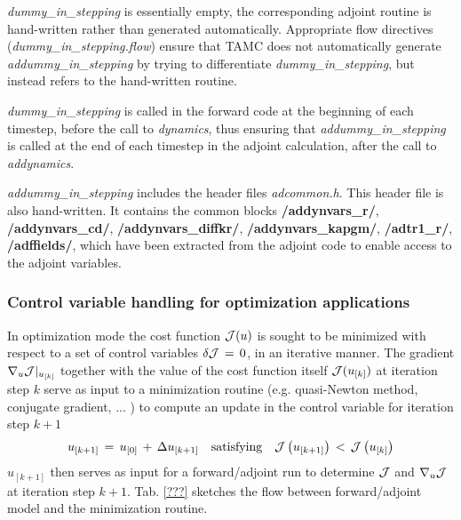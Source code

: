 \begin{itemize}
{\it dummy\_in\_stepping} is essentially empty,
the corresponding adjoint routine is hand-written rather
than generated automatically.
Appropriate flow directives ({\it dummy\_in\_stepping.flow})
ensure that TAMC does not automatically 
generate {\it addummy\_in\_stepping} by trying to differentiate
{\it dummy\_in\_stepping}, but instead refers to 
the hand-written routine.

{\it dummy\_in\_stepping} is called in the forward code
at the beginning of each
timestep, before the call to {\it dynamics}, thus ensuring
that {\it addummy\_in\_stepping} is called at the end of
each timestep in the adjoint calculation, after the call to
{\it addynamics}.

{\it addummy\_in\_stepping} includes the header files
{\it adcommon.h}.
This header file is also hand-written. It contains
the common blocks 
{\bf /addynvars\_r/}, {\bf /addynvars\_cd/},
{\bf /addynvars\_diffkr/}, {\bf /addynvars\_kapgm/},
{\bf /adtr1\_r/}, {\bf /adffields/},
which have been extracted from the adjoint code to enable
access to the adjoint variables.
%
\end{itemize}


\subsubsection{Control variable handling for 
optimization applications}

In optimization mode the cost function $ {\cal J}(u) $ is sought
to be minimized with respect to a set of control variables
$ \delta {\cal J} \, = \, 0 $, in an iterative manner.
The gradient $ \nabla _{u}{\cal J} |_{u_{[k]}} $ together
with the value of the cost function itself $ {\cal J}(u_{[k]}) $ 
at iteration step $ k $ serve
as input to a minimization routine (e.g. quasi-Newton method,
conjugate gradient, ... \cite{gil-lem:89}) 
to compute an update in the
control variable for iteration step $k+1$
\[
u_{[k+1]} \, = \,  u_{[0]} \, + \, \Delta u_{[k+1]}
\quad \mbox{satisfying} \quad
 {\cal J} \left( u_{[k+1]} \right) \, < \, {\cal J} \left( u_{[k]} \right)
\]
$ u_{[k+1]} $ then serves as input for a forward/adjoint run
to determine $ {\cal J} $ and $ \nabla _{u}{\cal J} $ at iteration step
$ k+1 $.
Tab. \ref{???} sketches the flow between forward/adjoint model
and the minimization routine.


